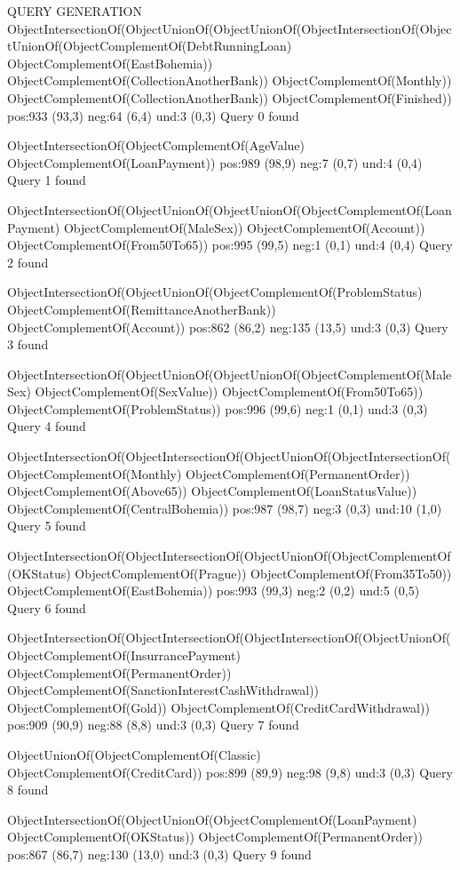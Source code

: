 QUERY GENERATION
ObjectIntersectionOf(ObjectUnionOf(ObjectUnionOf(ObjectIntersectionOf(ObjectUnionOf(ObjectComplementOf(DebtRunningLoan) ObjectComplementOf(EastBohemia)) ObjectComplementOf(CollectionAnotherBank)) ObjectComplementOf(Monthly)) ObjectComplementOf(CollectionAnotherBank)) ObjectComplementOf(Finished))
pos:933 (93,3)		 neg:64 (6,4)		 und:3 (0,3)
Query 0 found

ObjectIntersectionOf(ObjectComplementOf(AgeValue) ObjectComplementOf(LoanPayment))
pos:989 (98,9)		 neg:7 (0,7)		 und:4 (0,4)
Query 1 found

ObjectIntersectionOf(ObjectUnionOf(ObjectUnionOf(ObjectComplementOf(LoanPayment) ObjectComplementOf(MaleSex)) ObjectComplementOf(Account)) ObjectComplementOf(From50To65))
pos:995 (99,5)		 neg:1 (0,1)		 und:4 (0,4)
Query 2 found

ObjectIntersectionOf(ObjectUnionOf(ObjectComplementOf(ProblemStatus) ObjectComplementOf(RemittanceAnotherBank)) ObjectComplementOf(Account))
pos:862 (86,2)		 neg:135 (13,5)		 und:3 (0,3)
Query 3 found

ObjectIntersectionOf(ObjectUnionOf(ObjectUnionOf(ObjectComplementOf(MaleSex) ObjectComplementOf(SexValue)) ObjectComplementOf(From50To65)) ObjectComplementOf(ProblemStatus))
pos:996 (99,6)		 neg:1 (0,1)		 und:3 (0,3)
Query 4 found

ObjectIntersectionOf(ObjectIntersectionOf(ObjectUnionOf(ObjectIntersectionOf(ObjectComplementOf(Monthly) ObjectComplementOf(PermanentOrder)) ObjectComplementOf(Above65)) ObjectComplementOf(LoanStatusValue)) ObjectComplementOf(CentralBohemia))
pos:987 (98,7)		 neg:3 (0,3)		 und:10 (1,0)
Query 5 found

ObjectIntersectionOf(ObjectIntersectionOf(ObjectUnionOf(ObjectComplementOf(OKStatus) ObjectComplementOf(Prague)) ObjectComplementOf(From35To50)) ObjectComplementOf(EastBohemia))
pos:993 (99,3)		 neg:2 (0,2)		 und:5 (0,5)
Query 6 found

ObjectIntersectionOf(ObjectIntersectionOf(ObjectIntersectionOf(ObjectUnionOf(ObjectComplementOf(InsurrancePayment) ObjectComplementOf(PermanentOrder)) ObjectComplementOf(SanctionInterestCashWithdrawal)) ObjectComplementOf(Gold)) ObjectComplementOf(CreditCardWithdrawal))
pos:909 (90,9)		 neg:88 (8,8)		 und:3 (0,3)
Query 7 found

ObjectUnionOf(ObjectComplementOf(Classic) ObjectComplementOf(CreditCard))
pos:899 (89,9)		 neg:98 (9,8)		 und:3 (0,3)
Query 8 found

ObjectIntersectionOf(ObjectUnionOf(ObjectComplementOf(LoanPayment) ObjectComplementOf(OKStatus)) ObjectComplementOf(PermanentOrder))
pos:867 (86,7)		 neg:130 (13,0)		 und:3 (0,3)
Query 9 found

